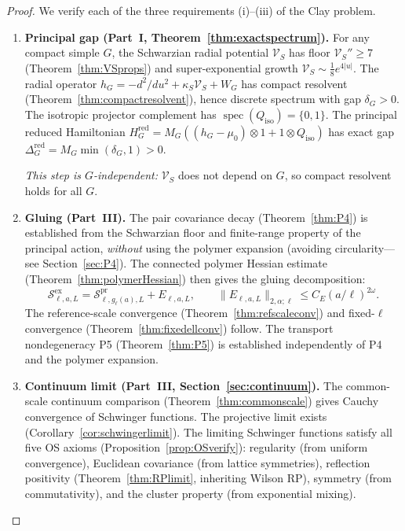 \documentclass[12pt]{article}
\theoremstyle{plain}
\theoremstyle{definition}
\numberwithin{equation}{section}
\newcommand{\spec}{\operatorname{spec}}
\newcommand{\pr}{\mathrm{pr}}
\newcommand{\red}{\mathrm{red}}
\newcommand{\iso}{\mathrm{iso}}
\newcommand{\ex}{\mathrm{ex}}
\begin{document}
\begin{proof}
We verify each of the three requirements (i)--(iii) of the Clay problem.

\begin{enumerate}[label=\textbf{Step~\arabic*.}]
\item \textbf{Principal gap (Part~I, Theorem~\ref{thm:exactspectrum}).}
For any compact simple $G$, the Schwarzian radial potential $\mathcal{V}_S$ has floor $\mathcal{V}_S''\geq 7$ (Theorem~\ref{thm:VSprops}) and super-exponential growth $\mathcal{V}_S\sim\frac{1}{8}e^{4|u|}$.  The radial operator $h_G=-d^2/du^2+\kappa_S\mathcal{V}_S+W_G$ has compact resolvent (Theorem~\ref{thm:compactresolvent}), hence discrete spectrum with gap $\delta_G>0$.  The isotropic projector complement has $\spec(Q_{\iso})=\{0,1\}$.  The principal reduced Hamiltonian $H_G^{\red}=M_G((h_G-\mu_0)\otimes 1+1\otimes Q_{\iso})$ has exact gap $\Delta_G^{\red}=M_G\min(\delta_G,1)>0$.

\emph{This step is $G$-independent:} $\mathcal{V}_S$ does not depend on $G$, so compact resolvent holds for all $G$.

\item \textbf{Gluing (Part~III).}
The pair covariance decay (Theorem~\ref{thm:P4}) is established from the Schwarzian floor and finite-range property of the principal action, \emph{without} using the polymer expansion (avoiding circularity---see Section~\ref{sec:P4}).  The connected polymer Hessian estimate (Theorem~\ref{thm:polymerHessian}) then gives the gluing decomposition:
\begin{equation}
\mathcal{S}^{\ex}_{\ell,a,L}=\mathcal{S}^{\pr}_{\ell,g_\ell(a),L}+E_{\ell,a,L},\qquad\|E_{\ell,a,L}\|_{2,\alpha;\ell}\leq C_E(a/\ell)^{2\omega}.
\end{equation}
The reference-scale convergence (Theorem~\ref{thm:refscaleconv}) and fixed-$\ell$ convergence (Theorem~\ref{thm:fixedellconv}) follow.  The transport nondegeneracy P5 (Theorem~\ref{thm:P5}) is established independently of P4 and the polymer expansion.

\item \textbf{Continuum limit (Part~III, Section~\ref{sec:continuum}).}
The common-scale continuum comparison (Theorem~\ref{thm:commonscale}) gives Cauchy convergence of Schwinger functions.  The projective limit exists (Corollary~\ref{cor:schwingerlimit}).  The limiting Schwinger functions satisfy all five OS axioms (Proposition~\ref{prop:OSverify}): regularity (from uniform convergence), Euclidean covariance (from lattice symmetries), reflection positivity (Theorem~\ref{thm:RPlimit}, inheriting Wilson RP), symmetry (from commutativity), and the cluster property (from exponential mixing).


\end{enumerate}
\end{proof}
\end{document}
